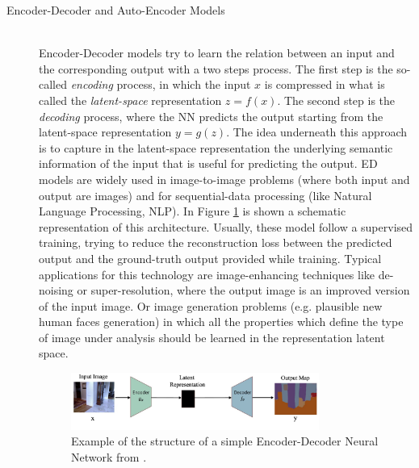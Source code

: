 \documentclass[12pt,a4paper]{report}
\begin{document}
\begin{description}
    \item [Encoder-Decoder and Auto-Encoder Models] \hfill \\
        Encoder-Decoder models try to learn the relation between an input and the corresponding output with a two steps process. The first step is the so-called \textit{encoding} process, in which the input $x$ is compressed in what is called the \textit{latent-space} representation $z = f(x)$. The second step is the \textit{decoding} process, where the NN predicts the output starting from the latent-space representation $ y = g(z)$. The idea underneath this approach is to capture in the latent-space representation the underlying semantic information of the input that is useful for predicting the output. ED models are widely used in image-to-image problems (where both input and output are images) and for sequential-data processing (like Natural Language Processing, NLP). In Figure \ref{fig:EDNN} is shown a schematic representation of this architecture. Usually, these model follow a supervised training, trying to reduce the reconstruction loss between the predicted output and the ground-truth output provided while training. Typical applications for this technology are image-enhancing techniques like de-noising or super-resolution, where the output image is an improved version of the input image. Or image generation problems (e.g. plausible new human faces generation) in which all the properties which define the type of image under analysis should be learned in the representation latent space.

        \begin{figure}
            \centering
            \includegraphics[width = 0.8\textwidth]{images/EDnet}
            \caption{Example of the structure of a simple Encoder-Decoder Neural Network from  \cite{deep_seg_SOA}.}
            \label{fig:EDNN}
        \end{figure}


\end{description}
\end{document}
